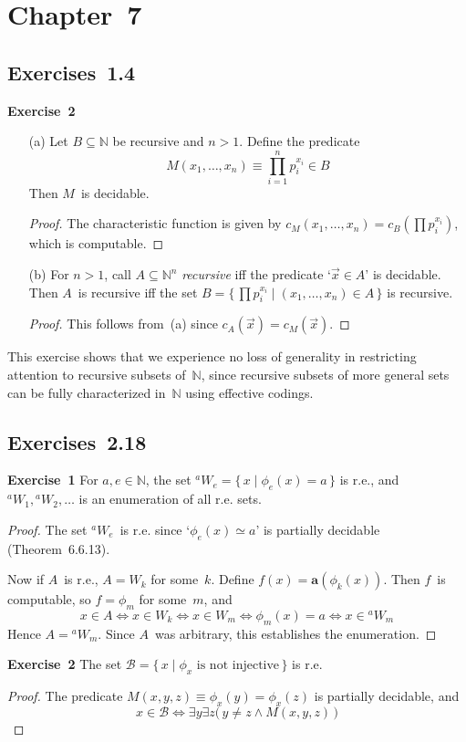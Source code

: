 \documentclass[letterpaper]{article}
\newcommand{\exercise}[2][]{\noindent\textbf{Exercise~{#2}}\ifthenelse{\isempty{#1}}{\textbf{.}}{ ({#1})\textbf{.}}}
\newcommand{\B}{\mathcal{B}}
\newcommand{\N}{\mathbb{N}}
\theoremstyle{plain}
\theoremstyle{definition}
\theoremstyle{remark}
\begin{document}
\section*{Chapter~7}
\subsection*{Exercises~1.4}
\exercise{2}
\begin{enumerate}[itemsep=0pt]
\item[(a)] Let $B\subseteq\N$ be recursive and $n>1$. Define the predicate
$$M(x_1,\ldots,x_n)\equiv \prod_{i=1}^n p_i^{x_i}\in B$$
Then $M$~is decidable.
\begin{proof}
The characteristic function is given by $c_M(x_1,\ldots,x_n)=c_B(\prod p_i^{x_i})$, which is computable.
\end{proof}
\item[(b)] For $n>1$, call $A\subseteq\N^n$ \emph{recursive} iff the predicate `$\vec{x}\in A$' is decidable. Then $A$~is recursive iff the set $B=\{\,\prod p_i^{x_i}\mid(x_1,\ldots,x_n)\in A\,\}$ is recursive.
\begin{proof}
This follows from~(a) since $c_A(\vec{x})=c_M(\vec{x})$.
\end{proof}
\end{enumerate}
\noindent This exercise shows that we experience no loss of generality in restricting attention to recursive subsets of~$\N$, since recursive subsets of more general sets can be fully characterized in~$\N$ using effective codings.

\subsection*{Exercises~2.18}
\exercise{1}
For $a,e\in\N$, the set ${}^aW_e=\{\,x\mid\phi_e(x)=a\,\}$ is r.e., and ${}^aW_1,{}^aW_2,\ldots$ is an enumeration of all r.e. sets.
\begin{proof}
The set ${}^aW_e$~is r.e. since `$\phi_e(x)\simeq a$' is partially decidable (Theorem~6.6.13).

Now if $A$~is r.e., $A=W_k$ for some~$k$. Define $f(x)=\mathbf{a}(\phi_k(x))$. Then $f$~is computable, so $f=\phi_m$ for some~$m$, and
$$x\in A\iff x\in W_k\iff x\in W_m\iff\phi_m(x)=a\iff x\in{}^aW_m$$
Hence $A={}^aW_m$. Since $A$~was arbitrary, this establishes the enumeration.
\end{proof}

\exercise{2}
The set $\B=\{\,x\mid\phi_x\text{ is not injective}\,\}$ is r.e.
\begin{proof}
The predicate $M(x,y,z)\equiv\phi_x(y)=\phi_x(z)$ is partially decidable, and
$$x\in\B\iff\exists y\exists z\bigl(\,y\ne z\land M(x,y,z)\,\bigr)$$
\end{proof}
\end{document}
